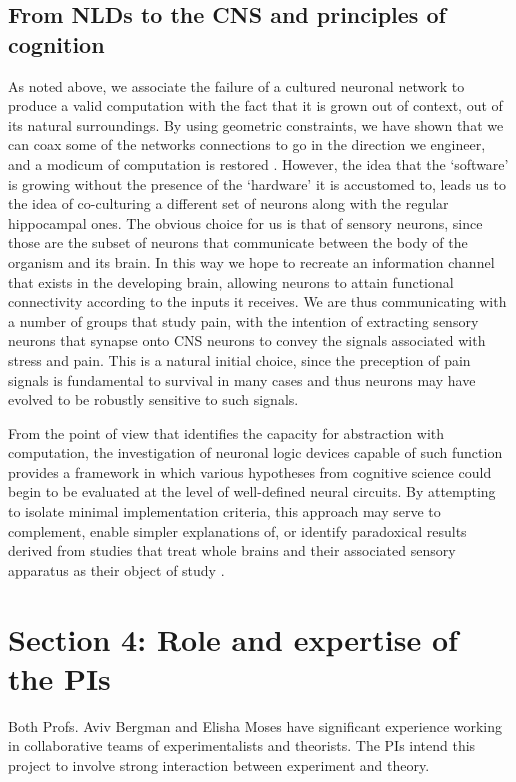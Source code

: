 \subsection{From NLDs to the CNS and principles of cognition}

As noted above, we associate the failure of a cultured neuronal network to produce a valid computation with the fact that it is grown out of context, out of its natural surroundings. By using geometric constraints, we have shown that we can coax some of the networks connections to go in the direction we engineer, and a modicum of computation is restored \cite{Feinerman2008}. However, the idea that the `software' is growing without the presence of the `hardware' it is accustomed to, leads us to the idea of co-culturing a different set of neurons along with the regular hippocampal ones. The obvious choice for us is that of sensory neurons, since those are the subset of neurons that communicate between the body of the organism and its brain. In this way we hope to recreate an information channel that exists in the developing brain, allowing neurons to attain functional connectivity according to the inputs it receives.
We are thus communicating with a number of groups that study pain, with the intention of extracting sensory neurons that synapse onto CNS neurons to convey the signals associated with stress and pain. This is a natural initial choice, since the preception of pain signals is fundamental to survival in many cases and thus neurons may have evolved to be robustly sensitive to such signals.

From the point of view that identifies the capacity for abstraction with
computation, the investigation of neuronal logic devices capable of such
function provides a framework in which various hypotheses from cognitive
science could begin to be evaluated at the level of well-defined neural
circuits. By attempting to isolate minimal implementation criteria, this
approach may serve to complement, enable simpler explanations of, or
identify paradoxical results derived from studies that treat whole
brains and their associated sensory apparatus as their object of study
\cite{McClelland2010,Griffiths2010}.

\section{Section 4: Role and expertise of the PIs}
Both Profs. Aviv Bergman and Elisha Moses have significant experience working in collaborative teams of experimentalists and theorists. The PIs intend this project to involve strong interaction between experiment and theory.

